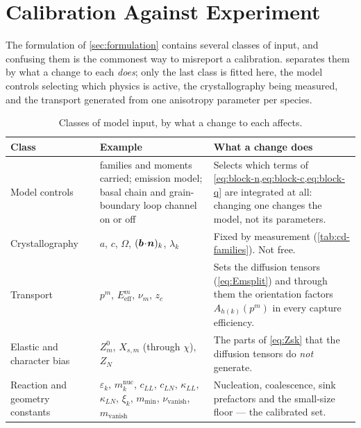 \section{Calibration Against Experiment}\label{sec:calibration}

\label{sec:controls}\label{sec:targets}\label{sec:objective}
The formulation of \cref{sec:formulation} contains several classes of input, and
confusing them is the commonest way to misreport a calibration.
 separates them by what a change to each \emph{does}; only
the last class is fitted here, the model controls selecting which physics is
active, the crystallography being measured, and the transport generated from one
anisotropy parameter per species.

\begin{table}[htbp]
\caption{Classes of model input, by what a change to each affects.}
\label{tab:controls}
\centering\small
\begin{tabularx}{\textwidth}{@{}>{\raggedright\arraybackslash}p{}XX@{}}
\toprule
Class & Example & What a change does \\
\midrule
Model controls &
  families and moments carried; emission model; basal chain and
  grain-boundary loop channel on or off &
  Selects which terms of \cref{eq:block-n,eq:block-c,eq:block-q} are integrated
  at all: changing one changes the model, not its parameters. \\
\addlinespace
Crystallography &
  $a$, $c$, $\Omega$, $(\bm{b}\!\cdot\!\bm{n})_k$, $\lambda_k$ &
  Fixed by measurement (\cref{tab:cd-families}). Not free. \\
\addlinespace
Transport &
  $p^{m}$, $E^{m}_{\mathrm{eff}}$, $\nu_m$, $z_c$ &
  Sets the diffusion tensors (\cref{eq:Emsplit}) and through them the
  orientation factors $A_{h(k)}(p^{m})$ in every capture efficiency. \\
\addlinespace
Elastic and character bias &
  $Z^{0}_m$, $X_{s,m}$ (through $\chi$), $Z_N$ &
  The parts of \cref{eq:Zsk} that the diffusion tensors do \emph{not}
  generate. \\
\addlinespace
Reaction and geometry constants &
  $\varepsilon_k$, $m^{\mathrm{nuc}}_k$, $c_{LL}$, $c_{LN}$, $\kappa_{LL}$,
  $\kappa_{LN}$, $\xi_k$, $m_{\min}$,
  $\nu_{\mathrm{vanish}}$, $m_{\mathrm{vanish}}$ &
  Nucleation, coalescence, sink prefactors and the small-size floor --- the
  calibrated set. \\
\bottomrule
\end{tabularx}
\end{table}


